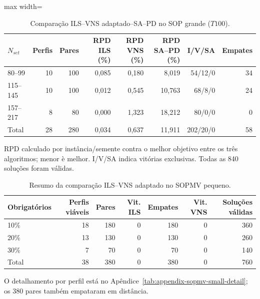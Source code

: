 \begin{table}[htbp]
\centering
\caption{Compara\c{c}\~ao ILS--VNS adaptado--SA--PD no SOP grande ($T100$).}
\label{tab:ils-vns-sapd-sop-large}
\begin{adjustbox}{max width=\textwidth}
\begin{tabular}{lrrrrrrr}
\toprule
$N_{set}$ & Perfis & Pares & RPD ILS (\%) & RPD VNS (\%) & RPD SA--PD (\%) & I/V/SA & Empates \\
\midrule
80--99 & 10 & 100 & 0{,}085 & 0{,}180 & 8{,}019 & 54/12/0 & 34 \\
115--145 & 10 & 100 & 0{,}012 & 0{,}545 & 10{,}763 & 68/8/0 & 24 \\
157--217 & 8 & 80 & 0{,}000 & 1{,}323 & 18{,}212 & 80/0/0 & 0 \\
\midrule
Total & 28 & 280 & 0{,}034 & 0{,}637 & 11{,}911 & 202/20/0 & 58 \\
\bottomrule
\end{tabular}
\end{adjustbox}
\begin{minipage}{0.96\linewidth}\footnotesize RPD calculado por inst\^ancia/semente contra o melhor objetivo entre os tr\^es algoritmos; menor \`e melhor. I/V/SA indica vit\'orias exclusivas. Todas as 840 solu\c{c}\~oes foram v\'alidas.\end{minipage}
\end{table}

\begin{table}[htbp]
\centering
\caption{Resumo da compara\c{c}\~ao ILS--VNS adaptado no SOPMV pequeno.}
\label{tab:ils-vns-sopmv-small-summary}
\begin{tabular}{lrrrrrr}
\toprule
Obrigat\'orios & Perfis vi\'aveis & Pares & Vit. ILS & Empates & Vit. VNS & Solu\c{c}\~oes v\'alidas \\
\midrule
10\% & 18 & 180 & 0 & 180 & 0 & 360 \\
20\% & 13 & 130 & 0 & 130 & 0 & 260 \\
30\% & 7 & 70 & 0 & 70 & 0 & 140 \\
\midrule
Total & 38 & 380 & 0 & 380 & 0 & 760 \\
\bottomrule
\end{tabular}
\begin{minipage}{0.94\linewidth}\footnotesize O detalhamento por perfil est\'a no Ap\^endice~\ref{tab:appendix-sopmv-small-detail}; os 380 pares tamb\'em empataram em dist\^ancia.\end{minipage}
\end{table}

